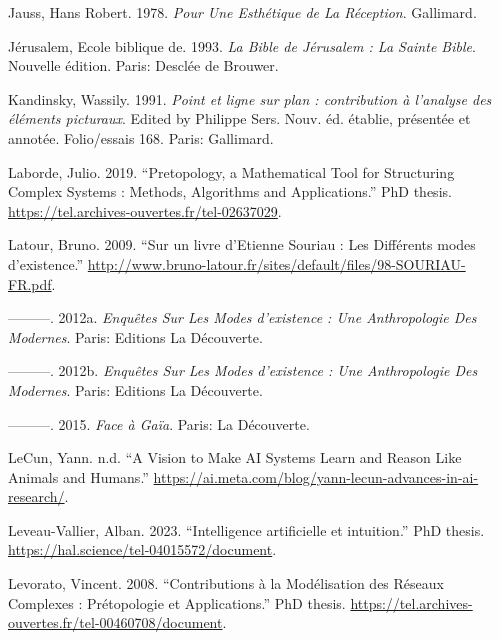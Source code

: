 \documentclass[
  letterpaper,
  DIV=11,
  numbers=noendperiod]{scrreprt}
\newlength{\cslhangindent}
\newlength{\cslentryspacingunit} %
\newenvironment{CSLReferences}[2] %
 {%
  \setlength{\parindent}{0pt}
  \ifodd #1
  \let\oldpar\par
  \def\par{\hangindent=\cslhangindent\oldpar}
  \fi
  \setlength{\parskip}{#2\cslentryspacingunit}
 }%
 {}
\begin{document}
\begin{CSLReferences}{1}{0}
\leavevmode{}%
Jauss, Hans Robert. 1978. \emph{Pour Une Esthétique de La Réception}.
Gallimard.

\leavevmode{}%
Jérusalem, Ecole biblique de. 1993. \emph{La Bible de Jérusalem : La
Sainte Bible}. Nouvelle édition. Paris: Desclée de Brouwer.

\leavevmode{}%
Kandinsky, Wassily. 1991. \emph{Point et ligne sur plan : contribution à
l'analyse des éléments picturaux}. Edited by Philippe Sers. Nouv. éd.
établie, présentée et annotée. Folio/essais 168. Paris: Gallimard.

\leavevmode{}%
Laborde, Julio. 2019. {``Pretopology, a Mathematical Tool for
Structuring Complex Systems : Methods, Algorithms and Applications.''}
PhD thesis. \url{https://tel.archives-ouvertes.fr/tel-02637029}.

\leavevmode{}%
Latour, Bruno. 2009. {``Sur un livre d{'}Etienne Souriau : Les
Différents modes d{'}existence.''}
\url{http://www.bruno-latour.fr/sites/default/files/98-SOURIAU-FR.pdf}.

\leavevmode{}%
---------. 2012a. \emph{Enquêtes Sur Les Modes d'existence : Une
Anthropologie Des Modernes}. Paris: Editions La Découverte.

\leavevmode{}%
---------. 2012b. \emph{Enquêtes Sur Les Modes d'existence : Une
Anthropologie Des Modernes}. Paris: Editions La Découverte.

\leavevmode{}%
---------. 2015. \emph{Face à Gaïa}. Paris: La Découverte.

\leavevmode{}%
LeCun, Yann. n.d. {``A Vision to Make AI Systems Learn and Reason Like
Animals and Humans.''}
\url{https://ai.meta.com/blog/yann-lecun-advances-in-ai-research/}.

\leavevmode{}%
Leveau-Vallier, Alban. 2023. {``Intelligence artificielle et
intuition.''} PhD thesis.
\url{https://hal.science/tel-04015572/document}.

\leavevmode{}%
Levorato, Vincent. 2008. {``Contributions à la Modélisation des Réseaux
Complexes : Prétopologie et Applications.''} PhD thesis.
\url{https://tel.archives-ouvertes.fr/tel-00460708/document}.


\end{CSLReferences}
\end{document}
